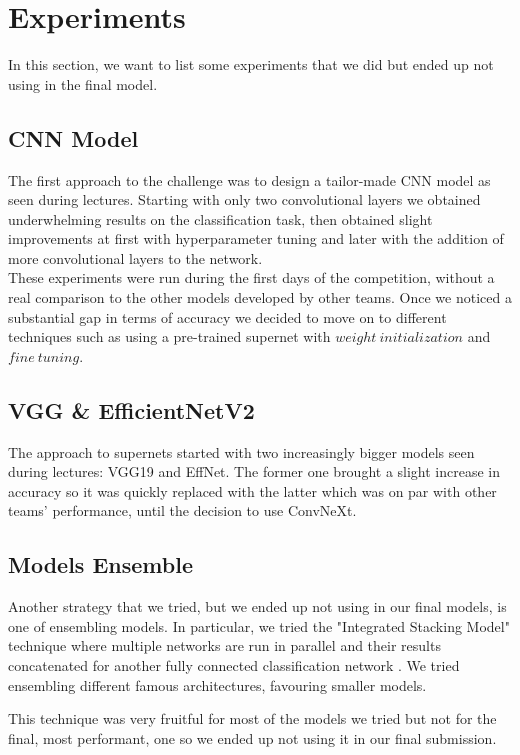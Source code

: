 
\section{Experiments}
In this section, we want to list some experiments that we did but ended up not using in the final model.

\subsection{CNN Model}
The first approach to the challenge was to design a tailor-made CNN model as seen during lectures. Starting with only two convolutional layers we obtained underwhelming results on the classification task, then obtained slight improvements at first with hyperparameter tuning and later with the addition of more convolutional layers to the network.\\
These experiments were run during the first days of the competition, without a real comparison to the other models developed by other teams. Once we noticed a substantial gap in terms of accuracy we decided to move on to different techniques such as using a pre-trained supernet with $weight\  initialization$  and $fine\ tuning$.

\subsection{VGG \& EfficientNetV2}
The approach to supernets started with two increasingly bigger models seen during lectures: VGG19\cite{VGG} and EffNet\cite{effnet}. The former one brought a slight increase in accuracy so it was quickly replaced with the latter which was on par with other teams' performance, until the decision to use ConvNeXt.

\subsection{Models Ensemble}
Another strategy that we tried, but we ended up not using in our final models, is one of ensembling models. In particular, we tried the "Integrated Stacking Model" technique where multiple networks are run in parallel and their results concatenated for another fully connected classification network \cite{ensemble}. We tried ensembling different famous architectures, favouring smaller models.

This technique was very fruitful for most of the models we tried but not for the final, most performant, one so we ended up not using it in our final submission.
